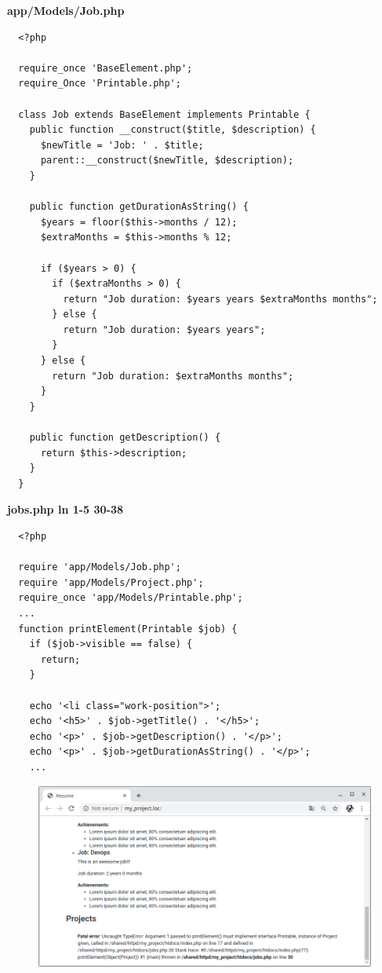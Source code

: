 \documentclass{article}
\begin{document}
\textbf{app/Models/Job.php}
\begin{verbatim}
  <?php

  require_once 'BaseElement.php';
  require_Once 'Printable.php';

  class Job extends BaseElement implements Printable {
    public function __construct($title, $description) {
      $newTitle = 'Job: ' . $title;
      parent::__construct($newTitle, $description);
    }

    public function getDurationAsString() {
      $years = floor($this->months / 12);
      $extraMonths = $this->months % 12;

      if ($years > 0) {
        if ($extraMonths > 0) {
          return "Job duration: $years years $extraMonths months";
        } else {
          return "Job duration: $years years";
        }
      } else {
        return "Job duration: $extraMonths months";
      }
    }

    public function getDescription() {
      return $this->description;
    }
  }
\end{verbatim}

\textbf{jobs.php ln 1-5 30-38}
\begin{verbatim}
  <?php

  require 'app/Models/Job.php';
  require 'app/Models/Project.php';
  require_once 'app/Models/Printable.php';
  ...
  function printElement(Printable $job) {
    if ($job->visible == false) {
      return;
    }

    echo '<li class="work-position">';
    echo '<h5>' . $job->getTitle() . '</h5>';
    echo '<p>' . $job->getDescription() . '</p>';
    echo '<p>' . $job->getDurationAsString() . '</p>';
    ...
\end{verbatim}

\begin{figure}[h!]
  \centering
  \includegraphics[scale=0.5]{./Pictures/048_interface.png}
\end{figure}
\end{document}

